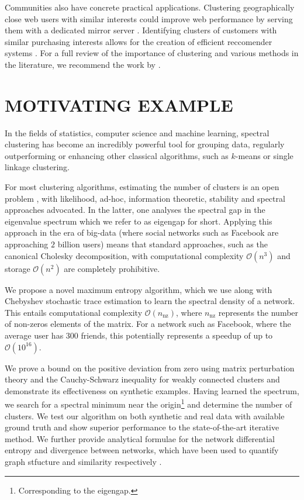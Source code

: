 \documentclass{article}
\begin{document}
Communities also have concrete practical applications. Clustering geographically close web users with similar interests could improve web performance by serving them with a dedicated mirror server \citep{krishnamurthy2000network}. Identifying clusters of customers with similar purchasing interests allows for the creation of efficient reccomender systems \citep{reddy2002graph}. For a full review of the importance of clustering and various methods in the literature, we recommend the work by \citet{fortunato2010community}.


\section{MOTIVATING EXAMPLE }
In the fields of statistics, computer science and machine learning, spectral clustering \citep{von2007tutorial} has become an incredibly powerful tool for grouping data, regularly outperforming or enhancing other classical algorithms, such as $k$-means or single linkage clustering.

For most clustering algorithms, estimating the number of clusters is an open problem \citep{von2007tutorial}, with likelihood, ad-hoc, information theoretic, stability and spectral approaches advocated. In the latter, one analyses the spectral gap in the eigenvalue spectrum which we refer to as eigengap for short. Applying this approach in the era of big-data (where social networks such as Facebook are approaching $2$ billion users) means that standard approaches, such as the canonical Cholesky decomposition, with computational complexity $\mathcal{O}(n^{3})$  and storage $\mathcal{O}(n^{2})$ are completely prohibitive. 


We propose a novel maximum entropy algorithm, which we use along with Chebyshev stochastic trace estimation to learn the spectral density of a network. This entails computational complexity $\mathcal{O}(n_\mathrm{nz})$,  where $n_\mathrm{nz}$ represents the number of non-zeros elements of the matrix. For a network such as Facebook, where the average user has $300$ friends, this potentially represents a speedup of up to $\mathcal{O}(10^{16})$.

We prove a bound on the positive deviation from zero using matrix perturbation theory and the Cauchy-Schwarz inequality for weakly connected clusters and demonstrate its effectiveness on synthetic examples. Having learned the spectrum, we search for a spectral minimum near the origin\footnote{Corresponding to the eigengap.} and determine the number of clusters. We test our algorithm on both synthetic and real data with available ground truth and show superior performance to the state-of-the-art iterative method. We further provide analytical formulae for the network differential entropy and divergence between networks, which have been used to quantify graph stfucture and similarity respectively \citep{takahashi2012discriminating}.
\end{document}
